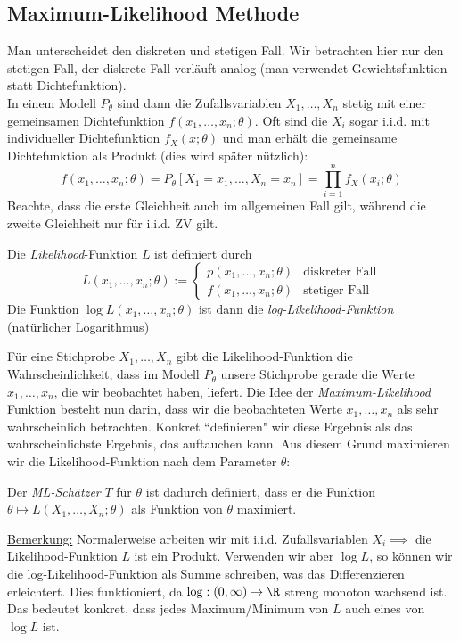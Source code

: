 \subsection{Maximum-Likelihood Methode}
Man unterscheidet den diskreten und stetigen Fall. Wir betrachten hier nur den stetigen Fall, der diskrete Fall verläuft analog (man verwendet Gewichtsfunktion statt Dichtefunktion).\\

In einem Modell $P_\theta$ sind dann die Zufallsvariablen $X_1,\dots,X_n$ stetig mit einer gemeinsamen Dichtefunktion $f(x_1,\dots,x_n; \theta)$. Oft sind die $X_i$ sogar i.i.d. mit individueller Dichtefunktion $f_X(x;\theta)$ und man erhält die gemeinsame Dichtefunktion als Produkt (dies wird später nützlich):
$$ f(x_1,\dots,x_n; \theta) = P_\theta[X_1 = x_1, \dots, X_n = x_n] = \prod_{i=1}^n f_X(x_i;\theta)$$
Beachte, dass die erste Gleichheit auch im allgemeinen Fall gilt, während die zweite Gleichheit nur für i.i.d. ZV gilt.
\begin{definition}
Die \textit{Likelihood}-Funktion $L$ ist definiert durch 
$$  L(x_1,\dots,x_n;\theta) := \begin{cases} p(x_1,\dots,x_n; \theta) & \mbox{diskreter Fall} \\ f(x_1,\dots,x_n;\theta) & \mbox{stetiger Fall} \end{cases} $$
Die Funktion $\log L(x_1,\dots,x_n;\theta)$ ist dann die \textit{log-Likelihood-Funktion} (natürlicher Logarithmus)
\end{definition}

Für eine Stichprobe $X_1,\dots,X_n$ gibt die Likelihood-Funktion die Wahrscheinlichkeit, dass im Modell $P_\theta$ unsere Stichprobe gerade die Werte $x_1,\dots,x_n$, die wir beobachtet haben, liefert. Die Idee der \textit{Maximum-Likelihood} Funktion besteht nun darin, dass wir die beobachteten Werte $x_1,\dots,x_n$ als sehr wahrscheinlich betrachten. Konkret ``definieren" wir diese Ergebnis als das wahrscheinlichste Ergebnis, das auftauchen kann. Aus diesem Grund maximieren wir die Likelihood-Funktion nach dem Parameter $\theta$:
\begin{definition}
Der \textit{ML-Schätzer} $T$ für $\theta$ ist dadurch definiert, dass er die Funktion $\theta \mapsto L(X_1, \dots, X_n; \theta)$ als Funktion von $\theta$ maximiert.
\end{definition}
\underline{Bemerkung:} Normalerweise arbeiten wir mit i.i.d. Zufallsvariablen $X_i \implies $ die Likelihood-Funktion $L$ ist ein Produkt. Verwenden wir aber $ \log L$, so können wir die log-Likelihood-Funktion als Summe schreiben, was das Differenzieren erleichtert. Dies funktioniert, da $\log: (0,\infty) \to \R$ streng monoton wachsend ist. Das bedeutet konkret, dass jedes Maximum/Minimum von $L$ auch eines von $\log L$ ist.\\

